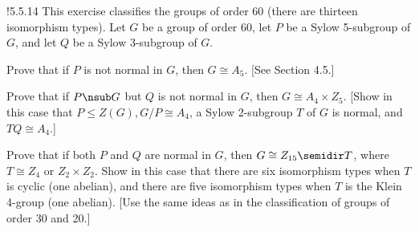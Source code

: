 \begin{exercise}!{5.5.14}
    This exercise classifies the groups of order 60 (there are thirteen isomorphism types).
	Let $G$ be a group of order 60, let $P$ be a Sylow 5-subgroup of $G$, and let $Q$ be a Sylow 3-subgroup of $G$.
    \begin{subexercises}
        \item Prove that if $P$ is not normal in $G$, then $G \cong A_5$. [See Section 4.5.]
        \item Prove that if $P \nsub G$ but $Q$ is not normal in $G$, then $G \cong A_4 \times Z_5$. [Show in this case that $P \leq Z(G), G/P \cong A_4$, a Sylow 2-subgroup $T$ of $G$ is normal, and $TQ \cong A_4$.]
        \item Prove that if both $P$ and $Q$ are normal in $G$, then $G \cong Z_{15} \semidir T$, where $T \cong Z_4$ or $Z_2 \times Z_2$.
	    Show in this case that there are six isomorphism types when $T$ is cyclic (one abelian), and there are five isomorphism types when $T$ is the Klein 4-group (one abelian). [Use the same ideas as in the classification of groups of order 30 and 20.]
    \end{subexercises}
\end{exercise}

